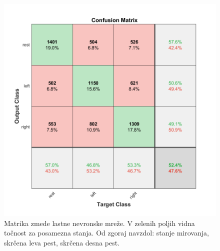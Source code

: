 \begin{figure}
\begin{center}
\includegraphics[width=0.8\linewidth]{slike/Confusion_13-20Hz_0s-4s.png}
\end{center}
\caption[Matrika zmede lastne nevronske mreže.]{Matrika zmede lastne nevronske mreže. V zelenih poljih vidna točnost za posamezna stanja. Od zgoraj navzdol: stanje mirovanja, skrčena leva pest, skrčena desna pest.}
\label{slika:nevronska_mreza_matrika}
\end{figure}




